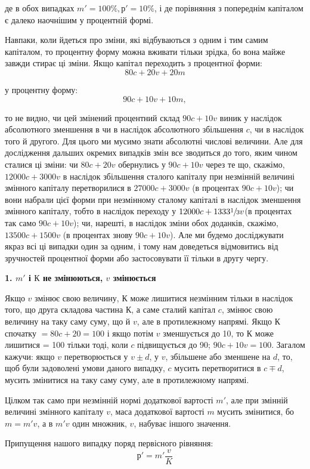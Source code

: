 \parcont{}  %
де в обох випадках $m' = 100\%, р' = 10\%$, і де порівняння з попереднім
капіталом є далеко наочнішим у процентній формі.

Навпаки, коли йдеться про зміни, які відбуваються з одним
і тим самим капіталом, то процентну форму можна вживати
тільки зрідка, бо вона майже завжди стирає ці зміни. Якщо
капітал переходить з процентної форми:\[
80c + 20v + 20m\]

у процентну форму:\[
90c + 10v + 10m,\]

то не видно, чи цей змінений процентний склад $90c + 10v$ виник
у наслідок абсолютного зменшення в чи в наслідок абсолютного
збільшення $c$, чи в наслідок того й другого. Для цього ми мусимо
знати абсолютні числові величини. Але для дослідження
дальших окремих випадків змін все зводиться до того, яким
чином сталися ці зміни: чи $80c + 20v$ обернулись у $90c + 10v$
через те що, скажімо, $12000c + 3000v$ в наслідок збільшення
сталого капіталу при незмінній величині змінного капіталу перетворилися
в $27000c + 3000v$ (в процентах $90c + 10v$); чи вони
набрали цієї форми при незмінному сталому капіталі в наслідок
зменшення змінного капіталу, тобто в наслідок переходу у
$12000c + 1333\sfrac{1}{3}v$(в процентах так само $90c + 10v$); чи, нарешті,
в наслідок зміни обох доданків, скажімо, $13500c + 1500v$
(в процентах знову $90c + 10v$). Але ми будемо досліджувати
якраз всі ці випадки один за одним, і тому нам доведеться
відмовитись від зручностей процентної форми або застосовувати
її тільки в другу чергу.
\begin{center}
  \textbf{1. $m'$ і $К$ не змінюються, $v$ змінюється}
\end{center}
Якщо $v$ змінює свою величину, $К$ може лишитися незмінним
тільки в наслідок того, що друга складова частина $К$, а саме
сталий капітал $c$, змінює свою величину на таку саму суму, що й $v$,
але в протилежному напрямі. Якщо $К$ спочатку $= 80c + 20 = 100$
і якщо потім $v$ зменшується до 10, то $К$ може лишитися = 100
тільки тоді, коли $c$ підвищується до 90; $90c + 10v = 100$. Загалом
кажучи: якщо $v$ перетворюється у $v \pm d$, у $v$, збільшене або
зменшене на $d$, то, щоб були задоволені умови даного випадку,
$c$ мусить перетворитися в $c \mp d$, мусить змінитися на таку саму
суму, але в протилежному напрямі.

Цілком так само при незмінній нормі додаткової вартості $m'$,
але при змінній величині змінного капіталу $v$, маса додаткової
вартості $m$ мусить змінитися, бо $m = m'v$, а в $m'v$ один множник,
$v$, набуває іншого значення.

Припущення нашого випадку поряд первісного рівняння:\[
р' = m'\frac{v}{K}\]
\parbreak{}  %
